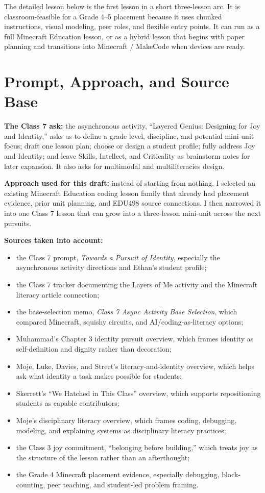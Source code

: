 \documentclass[11pt]{article}
\begin{document}
The detailed lesson below is the first lesson in a short three-lesson arc. It is classroom-feasible for a Grade 4--5 placement because it uses chunked instructions, visual modeling, peer roles, and flexible entry points. It can run as a full Minecraft Education lesson, or as a hybrid lesson that begins with paper planning and transitions into Minecraft / MakeCode when devices are ready.

\section*{Prompt, Approach, and Source Base}

\textbf{The Class 7 ask:} the asynchronous activity, ``Layered Genius: Designing for Joy and Identity,'' asks us to define a grade level, discipline, and potential mini-unit focus; draft one lesson plan; choose or design a student profile; fully address Joy and Identity; and leave Skills, Intellect, and Criticality as brainstorm notes for later expansion. It also asks for multimodal and multiliteracies design.

\textbf{Approach used for this draft:} instead of starting from nothing, I selected an existing Minecraft Education coding lesson family that already had placement evidence, prior unit planning, and EDU498 source connections. I then narrowed it into one Class 7 lesson that can grow into a three-lesson mini-unit across the next pursuits.

\textbf{Sources taken into account:}
\begin{itemize}[leftmargin=*]
    \item the Class 7 prompt, \emph{Towards a Pursuit of Identity}, especially the asynchronous activity directions and Ethan's student profile;
    \item the Class 7 tracker documenting the Layers of Me activity and the Minecraft literacy article connection;
    \item the base-selection memo, \emph{Class 7 Async Activity Base Selection}, which compared Minecraft, squishy circuits, and AI/coding-as-literacy options;
    \item Muhammad's Chapter 3 identity pursuit overview, which frames identity as self-definition and dignity rather than decoration;
    \item Moje, Luke, Davies, and Street's literacy-and-identity overview, which helps ask what identity a task makes possible for students;
    \item Skerrett's ``We Hatched in This Class'' overview, which supports repositioning students as capable contributors;
    \item Moje's disciplinary literacy overview, which frames coding, debugging, modeling, and explaining systems as disciplinary literacy practices;
    \item the Class 3 joy commitment, ``belonging before building,'' which treats joy as the structure of the lesson rather than an afterthought;
    \item the Grade 4 Minecraft placement evidence, especially debugging, block-counting, peer teaching, and student-led problem framing.
\end{itemize}
\end{document}

